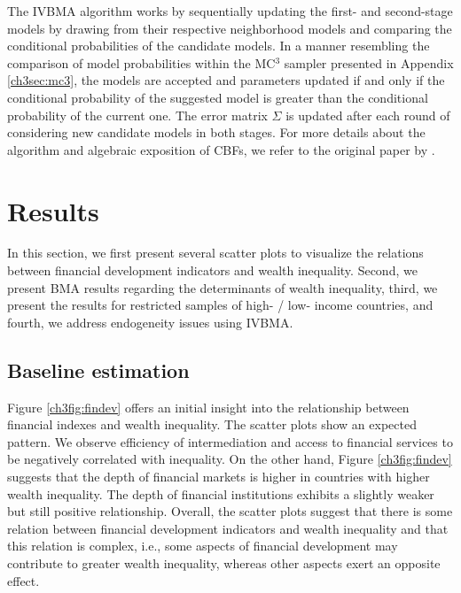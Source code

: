 \begin{refsection}
The \ac{IVBMA} algorithm works by sequentially updating the first- and second-stage models by drawing from their respective neighborhood models and comparing the conditional probabilities of the candidate models. In a manner resembling the comparison of model probabilities within the MC$^{3}$ sampler presented in Appendix \ref{ch3sec:mc3}, the models are accepted and parameters updated if and only if the conditional probability of the suggested model is greater than the conditional probability of the current one. The error matrix $\Sigma$ is updated after each round of considering new candidate models in both stages. For more details about the algorithm and algebraic exposition of \acp{CBF}, we refer to the original paper by \textcite{KarlLenkoski2012}.
%
%
%
%
%
\section{Results}
\label{ch3sec:results}
In this section, we first present several scatter plots to visualize the relations between financial development indicators and wealth inequality. Second, we present \ac{BMA} results regarding the determinants of wealth inequality, third, we present the results for restricted samples of high- / low- income countries, and fourth, we address endogeneity issues using \ac{IVBMA}.

\subsection{Baseline estimation}
Figure \ref{ch3fig:findev} offers an initial insight into the relationship between financial indexes and wealth inequality. The scatter plots show an expected pattern.  We observe efficiency of intermediation and access to financial services to be negatively correlated with inequality. On the other hand, Figure \ref{ch3fig:findev} suggests that the depth of financial markets is higher in countries with higher wealth inequality. The depth of financial institutions exhibits a slightly weaker but still positive relationship. Overall, the scatter plots suggest that there is some relation between financial development indicators and wealth inequality and that this relation is complex, i.e., some aspects of financial development may contribute to greater wealth inequality, whereas other aspects exert an opposite effect.


\end{refsection}
